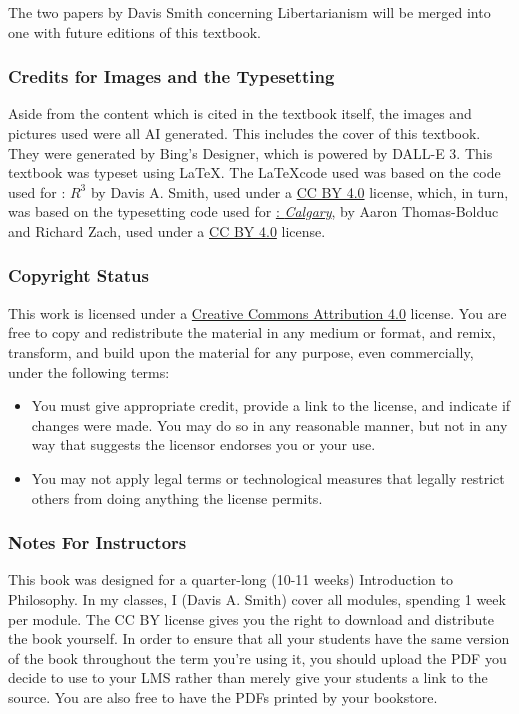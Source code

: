 The two papers by Davis Smith concerning Libertarianism will be merged into one with future editions of this textbook.

\subsubsection{Credits for Images and the Typesetting}
Aside from the content which is cited in the textbook itself, the images and pictures used were all AI generated. This includes the cover of this textbook. They were generated by Bing's Designer, which is powered by DALL-E 3. This textbook was typeset using \LaTeX. The \LaTeX code used was based on the code used for \forallx: \emph{$R^3$} by Davis A. Smith, used under a 
\href{https://creativecommons.org/licenses/by/4.0/}{CC BY 4.0} license, which, in turn, was based on the typesetting code used for \href{https://forallx.openlogicproject.org/}{\forallx: \emph{Calgary}}, 
by Aaron Thomas-Bolduc and Richard Zach, used under a 
\href{https://creativecommons.org/licenses/by/4.0/}{CC BY 4.0} license. 

\subsubsection{Copyright Status}

This work is licensed under a \href{https://creativecommons.org/licenses/by/4.0/}{Creative Commons Attribution 4.0} license.
You are free to copy and redistribute the material in any medium or format, and  remix, transform, and build upon the material for any purpose, even commercially, under the following terms:
\begin{itemize}
\item You must give appropriate credit, provide a link to the license, and indicate if changes were made. You may do so in any reasonable manner, but not in any way that suggests the licensor endorses you or your use.
\item You may not apply legal terms or technological measures that legally restrict others from doing anything the license permits.
\end{itemize}

\subsubsection{Notes For Instructors}

This book was designed for a quarter-long (10-11 weeks) Introduction to Philosophy. In my classes, I (Davis A. Smith) cover all modules, spending 1 week per module. The CC BY license gives you the right to download and distribute the book yourself. In order to ensure that all your students have the same version of the book throughout the term you’re using it, you should upload the PDF you decide to use to your LMS rather than merely give your students a link to the source. You are also free to have the PDFs printed by your bookstore.

